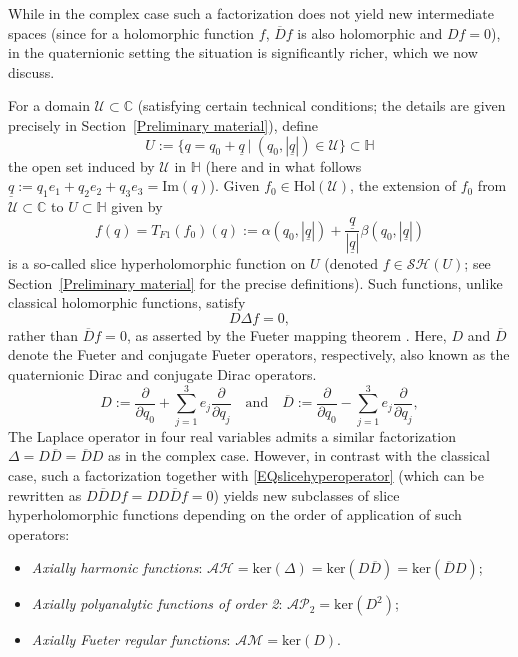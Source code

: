 \documentclass[reqno,11pt]{amsart}
\theoremstyle{definition}
\begin{document}
While in the complex case such a factorization does not yield new intermediate spaces (since for a holomorphic function $f$, $\overline{D}f$ is also holomorphic and $Df=0$), in the quaternionic setting the situation is significantly richer, which we now discuss.

For a domain $\mathcal{U}\subset \mathbb{C}$ (satisfying certain technical conditions; the details are given precisely in Section~\ref{Preliminary material}), define
\[
U:=\big\{q=q_0+ \underline{q} \ | \ (q_0, |\underline{q}|) \in \mathcal{U}\big\}\subset \mathbb{H}
\]
the open set induced by $\mathcal{U}$ in $ \mathbb{H}$ (here and in what follows $\underline{q}:=q_1e_1+q_2e_2+q_3e_3=\textrm{Im}(q)$). Given $f_0\in \text{Hol}(\mathcal{U})$, the extension of $f_0$ from $\mathcal{U}\subset \mathbb{C}$ to $U\subset\mathbb{H}$ given by
\begin{equation*}
	f(q)= T_{F1}(f_0)(q):= \alpha(q_0, |\underline{q}|)+ \frac{\underline{q}}{|\underline{q}|} \beta(q_0, |\underline{q}|)
\end{equation*}
is a so-called slice hyperholomorphic function on $U$ (denoted $f\in \mathcal{SH}(U)$; see Section~\ref{Preliminary material} for the precise definitions). Such functions, unlike classical holomorphic functions, satisfy
\begin{equation}
	\label{EQslicehyperoperator}
D\Delta f =0,
\end{equation}
rather than $\overline{D}f=0$, as asserted by the Fueter mapping theorem \cite{Fueter}. Here, $D$ and $\overline{D}$ denote the Fueter and conjugate Fueter operators, respectively, also known as the quaternionic Dirac and conjugate Dirac operators.
\begin{equation*}
	D := \frac{\partial}{\partial q_0} + \sum_{j=1}^3 e_j \frac{\partial}{\partial q_j} \quad \text{and} \quad \overline{D} := \frac{\partial}{\partial q_0} - \sum_{j=1}^3 e_j \frac{\partial}{\partial q_j},
\end{equation*}
The Laplace operator in four real variables admits a similar factorization $\Delta=D\overline{D}=\overline{D}D$ as in the complex case. However, in contrast with the classical case, such a factorization together with \eqref{EQslicehyperoperator} (which can be rewritten as $D\overline{D}Df=DD\overline{D}f=0$) yields new subclasses of slice hyperholomorphic functions depending on the order of application of such operators:
\begin{itemize}
	\item \emph{Axially harmonic functions}: \( \mathcal{AH} = \textrm{ker}(\Delta) = \textrm{ker}(D\overline{D})=\textrm{ker}(\overline{D}D)\);
	\item \emph{Axially polyanalytic functions of order 2}: \( \mathcal{AP}_2 =\textrm{ker}(D^2)\);
	\item \emph{Axially Fueter regular functions}: \( \mathcal{AM}=  \textrm{ker}(D) \).
\end{itemize}
\end{document}
